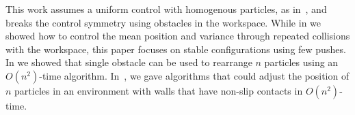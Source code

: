  This work assumes a uniform control with homogenous particles, as in~\cite{AaronManipulation2013}, and breaks the control symmetry using obstacles in the workspace. 
  While in \cite{shahrokhi2018TRO} we showed how to control the mean position and variance through repeated collisions with the workspace, this paper focuses on stable configurations using few pushes. 
   In \cite{AaronManipulation2013} we showed that single obstacle can be used to rearrange $n$ particles using an $O(n^2)$-time algorithm.
   In~\cite{shahrokhi2017}, we gave algorithms that could adjust the position of $n$ particles in an environment with walls that have non-slip contacts in $O(n^2)$-time. %
 


